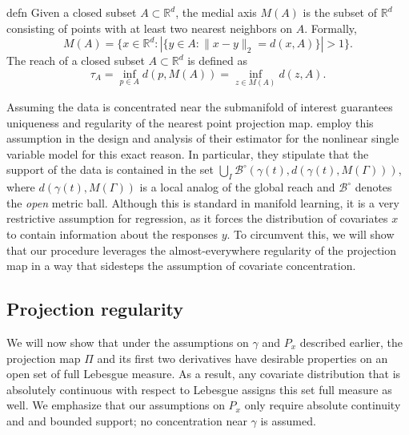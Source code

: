\documentclass[11pt]{article}
\begin{document}
\begin{restatable}{defn}{}
    Given a closed subset $A \subset \mathbb{R}^d$, the medial axis $M(A)$ is the subset of $\mathbb{R}^d$ consisting of points with at least two nearest neighbors on $A$. Formally,
    \begin{equation}
    M(A) = \{x \in \mathbb{R}^d : |\{y \in A : \|x-y\|_2 = d(x,A)\}| > 1\}. \label{eq: medial axis definition}
    \end{equation}
    The reach of a closed subset $A \subset \mathbb{R}^d$ is defined as 
    \begin{equation}
        \tau_A = \inf_{p\in A} d(p,M(A)) = \inf_{z\in M(A)}d(z,A). \label{eq: reach definition}
    \end{equation}
\end{restatable}

Assuming the data is concentrated near the submanifold of interest guarantees uniqueness and regularity of the nearest point projection map. \citet{wu2024conditional} employ this assumption in the design and analysis of their estimator for the nonlinear single variable model for this exact reason. In particular, they stipulate that the support of the data is contained in the set $\bigcup_{I}\mathcal{B}^\circ(\gamma(t), d(\gamma(t), M(\Gamma)))$, where $d(\gamma(t), M(\Gamma))$ is a local analog of the global reach and $\mathcal{B}^\circ$ denotes the \emph{open} metric ball. Although this is standard in manifold learning, it is a very restrictive assumption for regression, as it forces the distribution of covariates $x$ to contain information about the responses $y$. To circumvent this, we will show that our procedure leverages the almost-everywhere regularity of the projection map in a way that sidesteps the assumption of covariate concentration.

\subsection{Projection regularity}
We will now show that under the assumptions on $\gamma$ and $P_x$ described earlier, the projection map $\Pi$ and its first two derivatives have desirable properties on an open set of full Lebesgue measure. As a result, any covariate distribution that is absolutely continuous with respect to Lebesgue assigns this set full measure as well. We emphasize that our assumptions on $P_x$ only require absolute continuity and and bounded support; no concentration near $\gamma$ is assumed.
\end{document}
